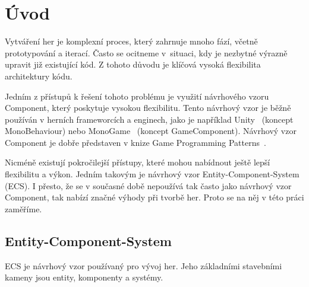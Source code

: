 \chapter{Úvod}
\label{chap:intro}
Vytváření her je komplexní proces, který zahrnuje mnoho fází, včetně prototypování a iterací. Často se ocitneme v~situaci, kdy je nezbytné výrazně upravit již existující kód. Z tohoto důvodu je klíčová vysoká flexibilita architektury kódu.

Jedním z přístupů k řešení tohoto problému je využití návrhového vzoru Component, který poskytuje vysokou flexibilitu. Tento návrhový vzor je běžně používán v herních frameworcích a enginech, jako je například Unity~\cite{Unity} (koncept MonoBehaviour) nebo MonoGame~\cite{MonoGame} (koncept GameComponent). Návrhový vzor Component je dobře představen v knize Game Programming Patterns~\cite{nystrom2014game}.

Nicméně existují pokročilejší přístupy, které mohou nabídnout ještě lepší flexibilitu a výkon. Jedním takovým je návrhový vzor Entity-Component-System (ECS).  I přesto, že se v současné době nepoužívá tak často jako návrhový vzor Component, tak nabízí značné výhody při tvorbě her. Proto se na něj v této práci zaměříme.

\section{Entity-Component-System}
ECS je návrhový vzor používaný pro vývoj her. Jeho základními stavebními kameny jsou entity, komponenty a systémy.

